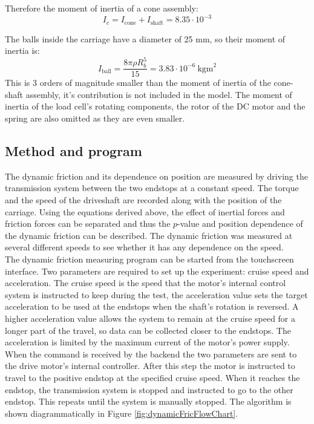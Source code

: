 \documentclass[12pt]{article}
\begin{document}
Therefore the moment of inertia of a cone assembly:
$$I_c = I_{\text{cone}}+I_{\text{shaft}} = 8.35 \cdot 10^{-3}$$

The balls inside the carriage have a diameter of 25 mm, so their moment of inertia is:
$$I_{\text{ball}} = \frac{8\pi \rho R_b^5}{15} =3.83\cdot 10^{-6}~\text{kgm}^2$$
This is 3 orders of magnitude smaller than the moment of inertia of the cone-shaft assembly, it's contribution is not included in the model. The moment of inertia of the load cell's rotating components, the rotor of the DC motor and the spring are also omitted as they are even smaller. 


\subsection{Method and program}
The dynamic friction and its dependence on position are measured by driving the transmission system between the two endstops at a constant speed. The torque and the speed of the driveshaft are recorded along with the position of the carriage. Using the equations derived above, the effect of inertial forces and friction forces can be separated and thus the $p$-value and position dependence of the dynamic friction can be described. The dynamic friction was measured at several different speeds to see whether it has any dependence on the speed.\\

The dynamic friction measuring program can be started from the touchscreen interface. Two parameters are required to set up the experiment: cruise speed and acceleration. The cruise speed is the speed that the motor's internal control system is instructed to keep during the test, the acceleration value sets the target acceleration to be used at the endstops when the shaft's rotation is reversed. A higher acceleration value allows the system to remain at the cruise speed for a longer part of the travel, so data can be collected closer to the endstops. The acceleration is limited by the maximum current of the motor's power supply.\\

When the command is received by the backend the two parameters are sent to the drive motor's internal controller. After this step the motor is instructed to travel to the positive endstop at the specified cruise speed. When it reaches the endstop, the transmission system is stopped and instructed to go to the other endstop. This repeats until the system is manually stopped. The algorithm is shown diagrammatically in Figure \ref{fig:dynamicFricFlowChart}.\\
\end{document}

